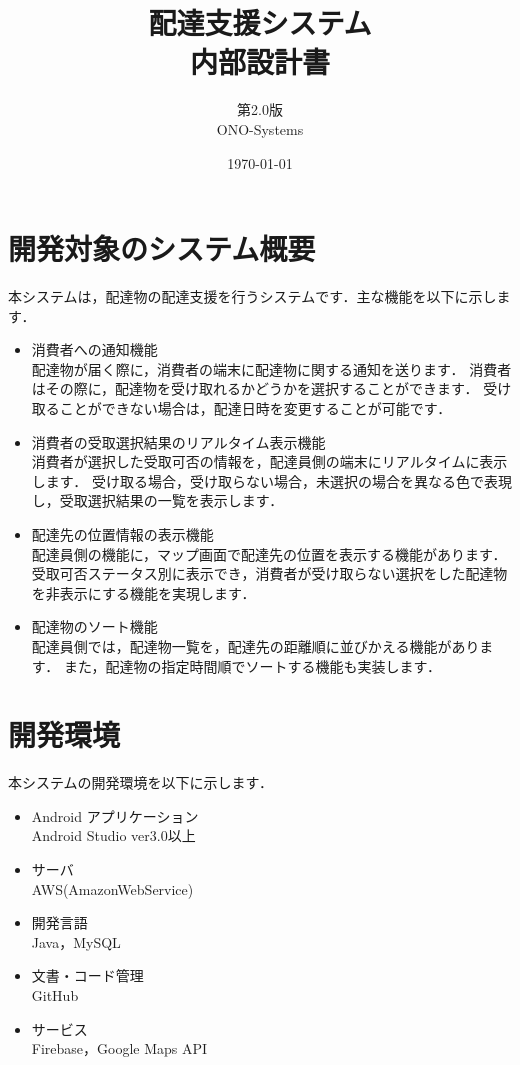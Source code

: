 \documentclass[a4j,titlepage]{jarticle}
\title{\huge 配達支援システム\\
		内部設計書}
\author{第2.0版\\
        ONO-Systems\\}
\date{\today}
\begin{document}
\maketitle

\tableofcontents
\clearpage


\section{開発対象のシステム概要}
本システムは，配達物の配達支援を行うシステムです．主な機能を以下に示します．
\begin{itemize}
\item 消費者への通知機能\\
  配達物が届く際に，消費者の端末に配達物に関する通知を送ります．
  消費者はその際に，配達物を受け取れるかどうかを選択することができます．
  受け取ることができない場合は，配達日時を変更することが可能です．
\item 消費者の受取選択結果のリアルタイム表示機能\\
  消費者が選択した受取可否の情報を，配達員側の端末にリアルタイムに表示します．
  受け取る場合，受け取らない場合，未選択の場合を異なる色で表現し，受取選択結果の一覧を表示します．
\item 配達先の位置情報の表示機能\\
  配達員側の機能に，マップ画面で配達先の位置を表示する機能があります．
  受取可否ステータス別に表示でき，消費者が受け取らない選択をした配達物を非表示にする機能を実現します．
\item 配達物のソート機能\\
  配達員側では，配達物一覧を，配達先の距離順に並びかえる機能があります．
  また，配達物の指定時間順でソートする機能も実装します．
\end{itemize}


\section{開発環境}
本システムの開発環境を以下に示します．
\begin{itemize}
\item Android アプリケーション\\
  Android Studio ver3.0以上
\item サーバ\\
  AWS(AmazonWebService)
\item 開発言語\\
  Java，MySQL
\item 文書・コード管理\\
  GitHub
\item サービス\\
  Firebase，Google Maps API
\end{itemize}
\end{document}
